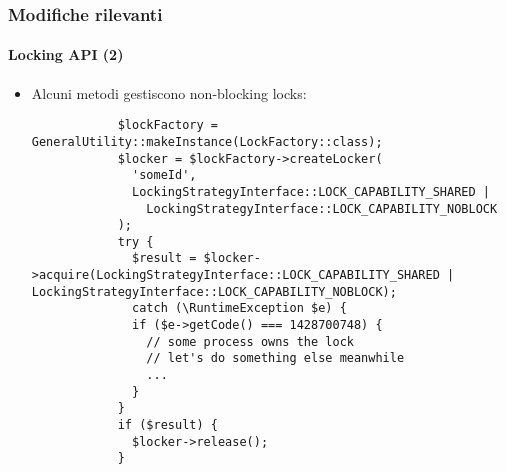\begin{frame}[fragile]
	\frametitle{Modifiche rilevanti}
	\framesubtitle{Locking API (2)}

	\lstset{basicstyle=\tiny\ttfamily}

	\begin{itemize}

		\item Alcuni metodi gestiscono non-blocking locks:

		\begin{lstlisting}
			$lockFactory = GeneralUtility::makeInstance(LockFactory::class);
			$locker = $lockFactory->createLocker(
			  'someId',
			  LockingStrategyInterface::LOCK_CAPABILITY_SHARED |
			    LockingStrategyInterface::LOCK_CAPABILITY_NOBLOCK
			);
			try {
			  $result = $locker->acquire(LockingStrategyInterface::LOCK_CAPABILITY_SHARED | LockingStrategyInterface::LOCK_CAPABILITY_NOBLOCK);
			  catch (\RuntimeException $e) {
			  if ($e->getCode() === 1428700748) {
			    // some process owns the lock
			    // let's do something else meanwhile
			    ...
			  }
			}
			if ($result) {
			  $locker->release();
			}
		\end{lstlisting}

	\end{itemize}

\end{frame}

